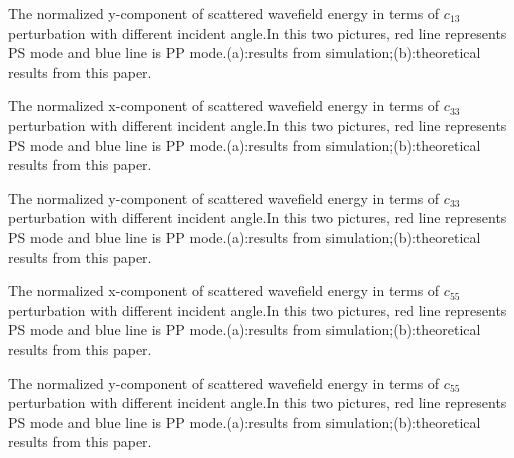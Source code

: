 {The normalized y-component of scattered wavefield energy in terms of $c_{13}$ perturbation with
different incident angle.In this two pictures, red line represents PS mode and blue line is PP
	mode.(a):results from simulation;(b):theoretical results from this paper.
	}

{The normalized x-component of scattered wavefield energy in terms of $c_{33}$ perturbation with
different incident angle.In this two pictures, red line represents PS mode and blue line is PP
	mode.(a):results from simulation;(b):theoretical results from this paper.
	}

{The normalized y-component of scattered wavefield energy in terms of $c_{33}$ perturbation with
different incident angle.In this two pictures, red line represents PS mode and blue line is PP
	mode.(a):results from simulation;(b):theoretical results from this paper.
	}

{The normalized x-component of scattered wavefield energy in terms of $c_{55}$ perturbation with
different incident angle.In this two pictures, red line represents PS mode and blue line is PP
	mode.(a):results from simulation;(b):theoretical results from this paper.
	}

{The normalized y-component of scattered wavefield energy in terms of $c_{55}$ perturbation with
different incident angle.In this two pictures, red line represents PS mode and blue line is PP
	mode.(a):results from simulation;(b):theoretical results from this paper.
	}
